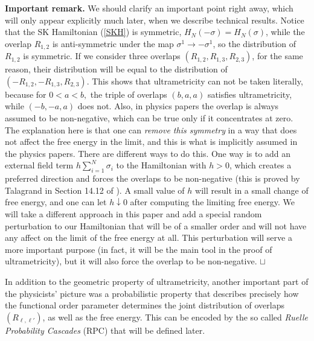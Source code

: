 \documentclass[12pt]{article}
\newcommand\qed{\hfill\hbox{\rlap{$\sqcap$}$\sqcup$}}
\theoremstyle{nonumberplain}
\begin{document}
\noindent
\textbf{Important remark.} We should clarify an important point right away, which will only appear explicitly much later, when we describe technical results. Notice that the SK Hamiltonian (\ref{SKH}) is symmetric, $H_{N}(-\sigma) = H_N(\sigma)$, while the overlap $R_{1,2}$ is anti-symmetric under the map $\sigma^1\to -\sigma^1$, so the distribution of $R_{1,2}$ is symmetric. If we consider three overlaps $(R_{1,2},R_{1,3}, R_{2,3})$, for the same reason, their distribution will be equal to the distribution of $(-R_{1,2},-R_{1,3}, R_{2,3}).$ This shows that ultrametricity can not be taken literally, because for $0<a<b,$ the triple of overlaps $(b,a,a)$ satisfies ultrametricity, while $(-b,-a,a)$ does not. Also, in physics papers the overlap is always assumed to be non-negative, which can be true only if it concentrates at zero. The explanation here is that one can \emph{remove this symmetry} in a way that does not affect the free energy in the limit, and this is what is implicitly assumed in the physics papers. There are different ways to do this. One way is to add an external field term $h\sum_{i=1}^N\sigma_i$ to the Hamiltonian with $h>0$, which creates a preferred direction and forces the overlaps to be non-negative (this is proved by Talagrand in Section 14.12 of \cite{SG2, SG2-2}). A small value of $h$ will result in a small change of free energy, and one can let $h\downarrow 0$ after computing the limiting free energy. We will take a different approach in this paper and add a special random perturbation to our Hamiltonian that will be of a smaller order and will not have any affect on the limit of the free energy at all. This perturbation will serve a more important purpose (in fact, it will be the main tool in the proof of ultrametricity), but it will also force the overlap to be non-negative.
\qed

\medskip
In addition to the geometric property of ultrametricity, another important part of the physicists' picture was a probabilistic property that describes precisely how the functional order parameter determines the joint distribution of overlaps $(R_{\ell,\ell'})$, as well as the free energy. This can be encoded by the so called \emph{Ruelle Probability Cascades} (RPC) that will be defined later.
\end{document}
